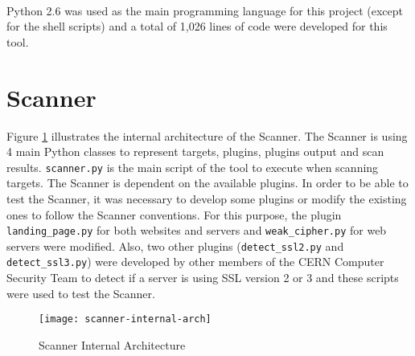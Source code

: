 \paragraph{}
Python 2.6 was used as the main programming language for this project (except for the shell scripts) and a total of 1,026 lines of code were developed for this tool. 
\section{Scanner}
Figure \ref{figure:scanner-internal-arch} illustrates the internal architecture of the Scanner. The Scanner is using 4 main Python classes to represent targets, plugins, plugins output and scan results. \texttt{scanner.py} is the main script of the tool to execute when scanning targets. The Scanner is dependent on the available plugins. In order to be able to test the Scanner, it was necessary to develop some plugins or modify the existing ones to follow the Scanner conventions. For this purpose, the plugin \texttt{landing\_page.py} for both websites and servers and \texttt{weak\_cipher.py} for web servers were modified. Also, two other plugins (\texttt{detect\_ssl2.py} and \texttt{detect\_ssl3.py}) were developed by other members of the CERN Computer Security Team to detect if a server is using SSL version 2 or 3 and these scripts were used to test the Scanner.
\begin{figure}[h!]
  \centering
    \texttt{[image: scanner-internal-arch]}
  \caption{Scanner Internal Architecture}
   \label{figure:scanner-internal-arch}
\end{figure}